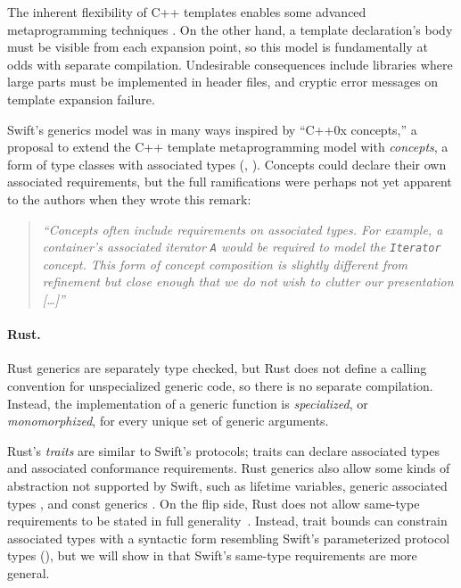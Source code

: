 \documentclass[../generics]{subfiles}
\begin{document}
The inherent flexibility of C++ templates enables some advanced metaprogramming techniques \cite{gregor}. On the other hand, a template declaration's body must be visible from each expansion point, so this model is fundamentally at odds with separate compilation. Undesirable consequences include libraries where large parts must be implemented in header files, and cryptic error messages on template expansion failure.

Swift's generics model was in many ways inspired by ``C++0x concepts,'' a proposal to extend the C++ template metaprogramming model with \emph{concepts}, a form of type classes with associated types (\cite{concepts}, \cite{essential}). Concepts could declare their own associated requirements, but the full ramifications were perhaps not yet apparent to the authors when they wrote this remark:
\begin{quote}
\textsl{``Concepts often include requirements on associated types. For example, a container's associated iterator \texttt{A} would be required to model the \texttt{Iterator} concept. This form of concept composition is slightly different from refinement but close enough that we do not wish to clutter our presentation [\ldots]''}
\end{quote}

\paragraph{Rust.}
Rust generics are separately type checked, but Rust does not define a calling convention for unspecialized generic code, so there is no separate compilation. Instead, the implementation of a generic function is \emph{specialized}, or \emph{monomorphized}, for every unique set of generic arguments.

Rust's \emph{traits} are similar to Swift's protocols; traits can declare associated types and associated conformance requirements. Rust generics also allow some kinds of abstraction not supported by Swift, such as lifetime variables, generic associated types \cite{rust_gat}, and const generics \cite{rust_const}. On the flip side, Rust does not allow same-type requirements to be stated in full generality~\cite{rust_same}. Instead, trait bounds can constrain associated types with a syntactic form resembling Swift's parameterized protocol types (), but we will show in  that Swift's same-type requirements are more general.
\end{document}
